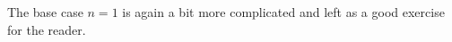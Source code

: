 \begin{example}
The base case $n=1$ is again a bit more complicated and left as a good exercise for the reader.
\end{example}


\begin{comment}

	\subsection{The suspension map and the cohomology of Euclidean space}\label{S: suspension}

	\red{I'm leaving it for now, but I'm not sure we need this section anymore (which is a shame as I enjoyed writing it).}

	\begin{proposition}
		$H_\Gamma^*(\R^n) \cong H^*(\R^n)$.
	\end{proposition}

	The proof of the proposition will proceed by an induction over the dimension $n$.
	For $n = 0$, the domains of all cochains must be compact and oriented, so $H^*_\Gamma(\R^0) = H_*^\Gamma(\R^0)$, where the latter represents Lipyanskiy's geometric homology theory, which is isomorphic to singular homology by \cite[Section 10]{Lipy14} (or in this case by direct computation).
	For $n>0$, our general strategy will be derived from the treatment of non-compactly supported piecewise-linear intersection homology in \cite[Section II.2]{BoHab}.
	In particular, we have the following two lemmas modifying \cite[Lemmas 2.2 and 2.3]{BoHab}.

	\begin{lemma}
		Let $M$ be a manifold, and suppose $\uW \in C^{i}_\Gamma(\R \times M)$ is a cocycle with support in $\R_+ \times M$.
		Then $\uW$ is the coboundary of a cochain in $C^{i-1}_\Gamma(\R \times M)$ supported in $\R_+ \times M$.
	\end{lemma}
	\begin{proof}
		Let $p_1 \colon \R \times M \to \R$ and $p_2 \colon \R \times M \to M$ be the projections, and let $r_W \colon W \to \R_+ \times M$ be the reference map.
		Note that $\R_+ \times W$ is a manifold with corners by \cite[Theorem 6.4]{Joy12}.
		So we can define a new map $r_{\R_+ \times W} \colon \R_+ \times W \to \R \times M$ by $r_{\R_+ \times W}(t,x) = (t+p_1r_W(x),p_2r_W(x))$.
		As $r_W$ is proper, so is $r_{\R_+ \times W}$, and its boundary (up to signs) is the sum of $W$ with $\pm r_{\R_+ \times \bd W} \colon \R_+ \times \bd W \to \R \times M$, letting this latter map be constructed analogously to $r_{\R_+ \times W}$.
		As $\bd W$ represents $0$ in $C^*_\Gamma(\R \times W)$, it must be a sum of trivial and degenerate objects.
		But it is easy to see that our construction takes trivial and degenerate objects to trivial and degenerate objects, respectively, so that $\R_+ \times \bd W$ is a sum of trivial and degenerate objects.
		Thus $W$ cobounds as required.
	\end{proof}


\end{comment}
